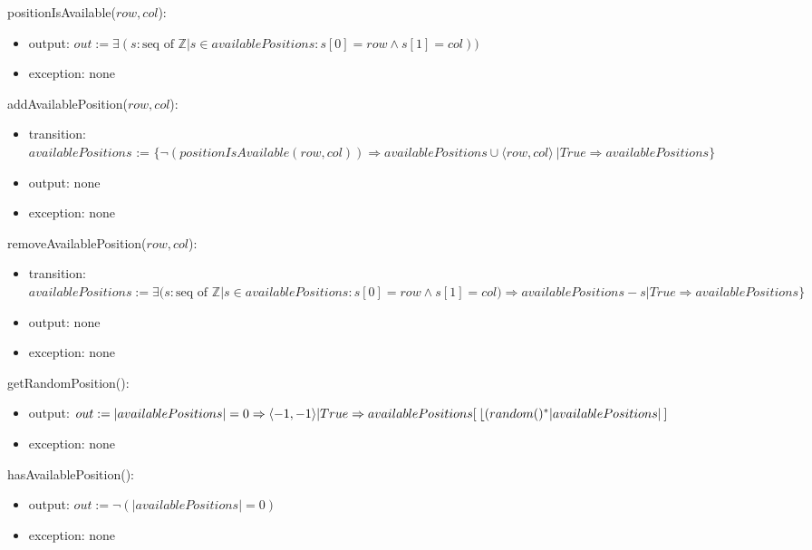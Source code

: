 \documentclass[12pt]{article}
\begin{document}
\noindent positionIsAvailable($row, col$):
\begin{itemize}

\item output: $out := \exists(s:\text{seq of } \mathbb{Z} | s \in availablePositions : s[0] = row \wedge s[1] = col))$
\item exception: none
\end{itemize}

\noindent addAvailablePosition($row, col$):
\begin{itemize}
\item transition: \\
    $availablePositions$ := $\{ \neg (positionIsAvailable(row, col)) \Rightarrow 
    availablePositions \cup \langle row, col \rangle\ | True \Rightarrow availablePositions\}$
\item output: none
\item exception: none
\end{itemize}


\noindent removeAvailablePosition($row, col$):
\begin{itemize}
\item transition: \\
    $availablePositions := \exists(s:\text{seq of } \mathbb{Z} | s \in availablePositions : s[0] = row \wedge s[1] = col) \Rightarrow 
    availablePositions - s | True \Rightarrow availablePositions\}$
\item output: none
\item exception: none
\end{itemize}

\noindent getRandomPosition():
\begin{itemize}
\item output: $out := |availablePositions| = 0 \Rightarrow \langle -1, -1 \rangle | True \Rightarrow \\
availablePositions[ \hspace{2px} \space \lfloor(random() ^* |availablePositions| \hspace{2px} ]$
\item exception: none
\end{itemize}

\noindent hasAvailablePosition():
\begin{itemize}
\item output: $out := \neg (|availablePositions| = 0)$
\item exception: none
\end{itemize}
\end{document}

